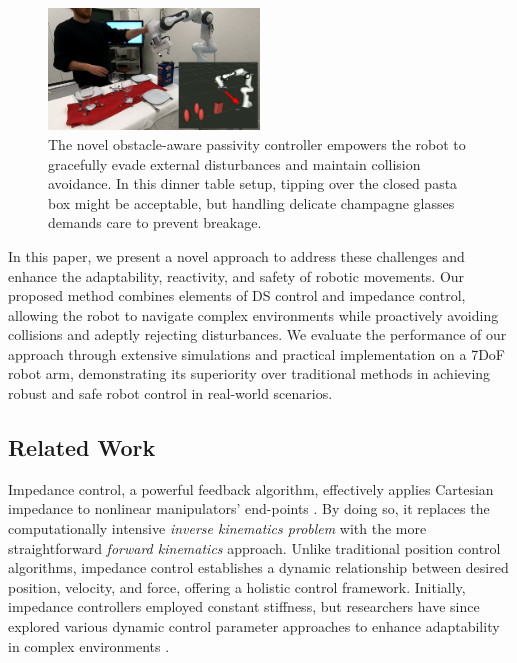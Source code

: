 \begin{figure}
\centerline{\includegraphics[width=0.5\textwidth]{figures/robot_arm_table_avoidance}}
\caption{
The novel obstacle-aware passivity controller empowers the robot to gracefully evade external disturbances and maintain collision avoidance. 
In this dinner table setup, tipping over the closed pasta box might be acceptable, but handling delicate champagne glasses demands care to prevent breakage.
}
\label{fig:table_avoidance_with_obstacle}
\end{figure}

In this paper, we present a novel approach to address these challenges and enhance the adaptability, reactivity, and safety of robotic movements. Our proposed method combines elements of DS control and impedance control, allowing the robot to navigate complex environments while proactively avoiding collisions and adeptly rejecting disturbances. We evaluate the performance of our approach through extensive simulations and practical implementation on a 7DoF robot arm, demonstrating its superiority over traditional methods in achieving robust and safe robot control in real-world scenarios.


\subsection{Related Work}
Impedance control, a powerful feedback algorithm, effectively applies Cartesian impedance to nonlinear manipulators' end-points \cite{takegaki1981new, hogan1985impedance}. By doing so, it replaces the computationally intensive \textit{inverse kinematics problem} with the more straightforward \textit{forward kinematics} approach. Unlike traditional position control algorithms, impedance control establishes a dynamic relationship between desired position, velocity, and force, offering a holistic control framework.
Initially, impedance controllers employed constant stiffness, but researchers have since explored various dynamic control parameter approaches to enhance adaptability in complex environments \cite{vanderborght2013variable, abu2020variable}.

